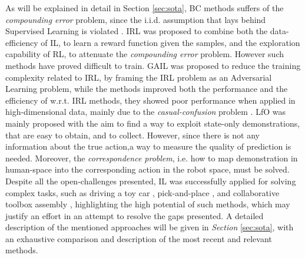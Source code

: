 As will be explained in detail in Section \ref{sec:sota}, BC methods suffers of the \textit{compounding error} problem, since the i.i.d. assumption that lays behind Supervised Learning is violated \cite{}. IRL was proposed to combine both the data-efficiency of IL, to learn a reward function given the samples, and the exploration capability of RL, to attenuate the \textit{compounding error} problem. However such methods have proved difficult to train. GAIL was proposed to reduce the training complexity related to IRL, by framing the IRL problem as an Adversarial Learning problem, while the methods improved both the performance and the efficiency of w.r.t. IRL methods, they showed poor performance when applied in high-dimensional data, mainly due to the \textit{casual-confusion} problem \cite{}. LfO \cite{} was mainly proposed with the aim to find a way to exploit state-only demonstrations, that are easy to obtain, and to collect. However, since there is not any information about the true action,a way to measure the quality of prediction is needed. Moreover, the \textit{correspondence problem}, i.e. how to map demonstration in human-space into the corresponding action in the robot space, must be solved.     
\newline Despite all the open-challenges presented, IL was successfully applied for solving complex tasks, such as driving a toy car \cite{codevilla2018end_to_end}, pick-and-place \cite{zhang2018deep}, and collaborative toolbox assembly \cite{maeda2017probabilistic}, highlighting the high potential of such methods, which may justify an effort in an attempt to resolve the gaps presented.
A detailed description of the mentioned approaches will be given in \textit{Section} \ref{sec:sota}, with an exhaustive comparison and description of the most recent and relevant methods.


